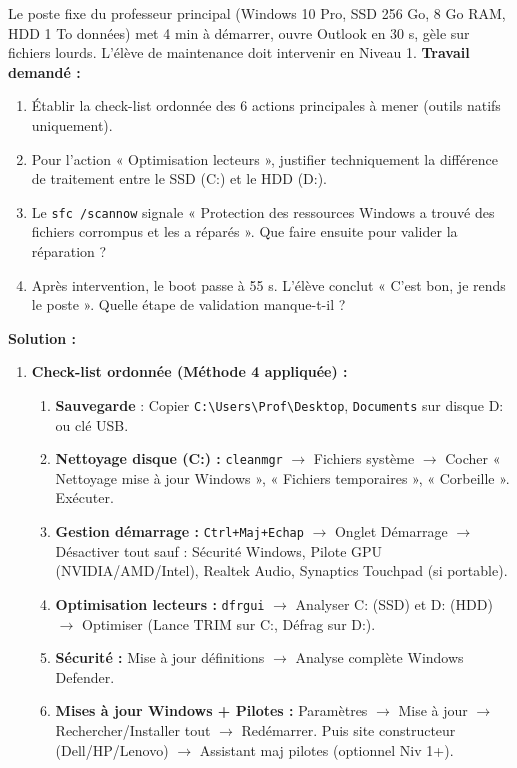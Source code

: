 \documentclass[11pt]{article}
\begin{document}
\begin{exoresolu}
Le poste fixe du professeur principal (Windows 10 Pro, SSD 256 Go, 8 Go RAM, HDD 1 To données) met 4 min à démarrer, ouvre Outlook en 30 s, gèle sur fichiers lourds. L'élève de maintenance doit intervenir en Niveau 1.
\textbf{Travail demandé :}
\begin{enumerate}
    \item Établir la check-list ordonnée des 6 actions principales à mener (outils natifs uniquement).
    \item Pour l'action « Optimisation lecteurs », justifier techniquement la différence de traitement entre le SSD (C:) et le HDD (D:).
    \item Le \texttt{sfc /scannow} signale « Protection des ressources Windows a trouvé des fichiers corrompus et les a réparés ». Que faire ensuite pour valider la réparation ?
    \item Après intervention, le boot passe à 55 s. L'élève conclut « C'est bon, je rends le poste ». Quelle étape de validation manque-t-il ?
\end{enumerate}
\tcblower
\textbf{Solution :}
\begin{enumerate}
    \item \textbf{Check-list ordonnée (Méthode 4 appliquée) :}
          \begin{enumerate}
              \item \textbf{Sauvegarde} : Copier \texttt{C:\textbackslash Users\textbackslash Prof\textbackslash Desktop}, \texttt{Documents} sur disque D: ou clé USB.
              \item \textbf{Nettoyage disque (C:) :} \texttt{cleanmgr} $\rightarrow$ Fichiers système $\rightarrow$ Cocher « Nettoyage mise à jour Windows », « Fichiers temporaires », « Corbeille ». Exécuter.
              \item \textbf{Gestion démarrage :} \texttt{Ctrl+Maj+Echap} $\rightarrow$ Onglet Démarrage $\rightarrow$ Désactiver tout sauf : Sécurité Windows, Pilote GPU (NVIDIA/AMD/Intel), Realtek Audio, Synaptics Touchpad (si portable).
              \item \textbf{Optimisation lecteurs :} \texttt{dfrgui} $\rightarrow$ Analyser C: (SSD) et D: (HDD) $\rightarrow$ Optimiser (Lance TRIM sur C:, Défrag sur D:).
              \item \textbf{Sécurité :} Mise à jour définitions $\rightarrow$ Analyse complète Windows Defender.
              \item \textbf{Mises à jour Windows + Pilotes :} Paramètres $\rightarrow$ Mise à jour $\rightarrow$ Rechercher/Installer tout $\rightarrow$ Redémarrer. Puis site constructeur (Dell/HP/Lenovo) $\rightarrow$ Assistant maj pilotes (optionnel Niv 1+).

\end{enumerate}
\end{enumerate}
\end{exoresolu}
\end{document}

